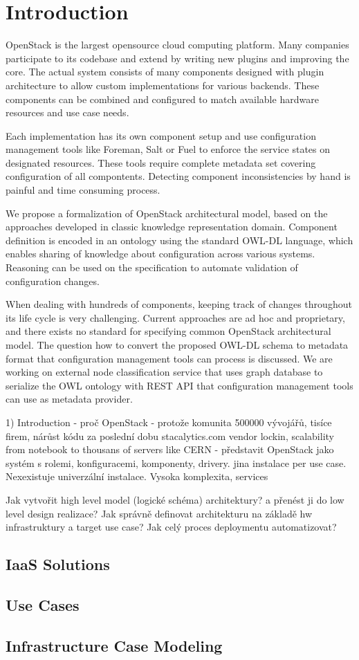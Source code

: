 
\section{Introduction}

OpenStack is the largest opensource cloud computing platform. Many companies participate to its codebase and extend by writing new plugins and improving the core. The actual system consists of many components designed with plugin architecture to allow custom implementations for various backends. These components can be combined and configured to match available hardware resources and use case needs.

Each implementation has its own component setup and use configuration management tools like Foreman, Salt or Fuel to enforce the service states on designated resources. These tools require complete metadata set covering configuration of all compontents. Detecting component inconsistencies by hand is painful and time consuming process.

We propose a formalization of OpenStack architectural model, based on the approaches developed in classic knowledge representation domain. Component definition is encoded in an ontology using the standard OWL-DL language, which enables sharing of knowledge about configuration across various systems. Reasoning can be used on the specification to automate validation of configuration changes.

When dealing with hundreds of components, keeping track of changes throughout its life cycle is very challenging. Current approaches are ad hoc and proprietary, and there exists no standard for specifying common OpenStack architectural model. The question how to convert the proposed OWL-DL schema to metadata format that configuration management tools can process is discussed. We are working on external node classification service that uses graph database to serialize the OWL ontology with REST API that configuration management tools can use as metadata provider.

1) Introduction 
 - proč OpenStack - protože komunita 500000 vývojářů, tisíce firem, nárůst kódu za poslední dobu stacalytics.com
          vendor lockin, scalability from notebook to thousans of servers like CERN
 - představit OpenStack jako systém s rolemi, konfiguracemi, komponenty, drivery. jina instalace per use case. Nexexistuje univerzální instalace. Vysoka komplexita, services

Jak vytvořit high level model (logické schéma) architektury? a přenést ji do low level design realizace? 
Jak správně definovat architekturu na základě hw infrastruktury a target use case?
Jak celý proces deploymentu automatizovat?

\subsection{IaaS Solutions}

\subsection{Use Cases}

\subsection{Infrastructure Case Modeling}
